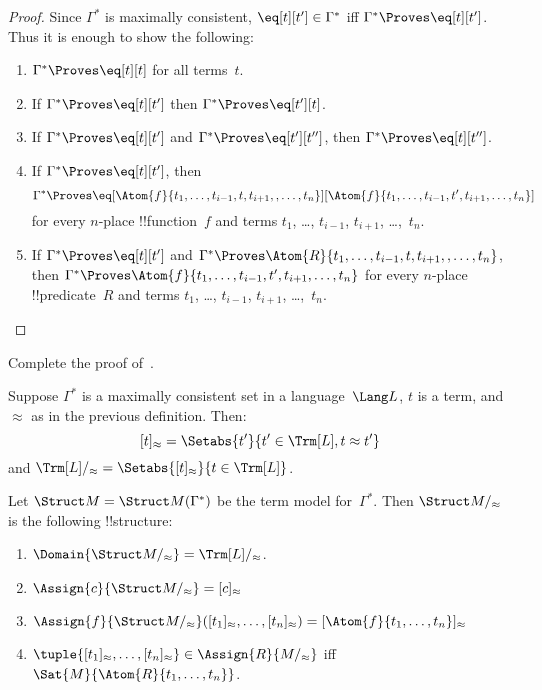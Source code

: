\documentclass[../../include/open-logic-section]{subfiles}
\begin{document}
\begin{proof}
Since $\Gamma^*$ is maximally consistent, $\eq[t][t'] \in \Gamma^*$
iff $\Gamma^* \Proves \eq[t][t']$. Thus it is enough to show the
following:
\begin{enumerate}
\item $\Gamma^* \Proves \eq[t][t]$ for all terms~$t$.
\item If $\Gamma^* \Proves \eq[t][t']$ then $\Gamma^* \Proves \eq[t'][t]$.
\item If $\Gamma^* \Proves \eq[t][t']$ and $\Gamma^* \Proves
  \eq[t'][t'']$, then $\Gamma^* \Proves \eq[t][t'']$.
\item If $\Gamma^* \Proves \eq[t][t']$, then 
\[
\Gamma^* \Proves
\eq[\Atom{f}{t_1,\dots,t_{i-1},t,t_{i+1},,\dots,t_n}][\Atom{f}{t_1,\dots,t_{i-1},t',t_{i+1},\dots,t_n}]
\]
for every $n$-place !!{function}~$f$ and terms $t_1$, \dots,
$t_{i-1}$, $t_{i+1}$, \dots,~$t_n$.
\item If $\Gamma^* \Proves \eq[t][t']$ and
$\Gamma^* \Proves
\Atom{R}{t_1,\dots,t_{i-1},t,t_{i+1},,\dots,t_n}$, then
$\Gamma^* \Proves \Atom{f}{t_1,\dots,t_{i-1},t',t_{i+1},\dots,t_n}$
for every $n$-place !!{predicate}~$R$ and terms $t_1$, \dots,
$t_{i-1}$, $t_{i+1}$, \dots,~$t_n$.
\end{enumerate}
\end{proof}

\begin{prob}
Complete the proof of~.
\end{prob}

\begin{defn}
Suppose $\Gamma^*$ is a maximally consistent set in a language~$\Lang
L$, $t$ is a term, and $\approx$ as in the previous definition. Then:
\[
[t]_\approx = \Setabs{t'}{t'\in \Trm[L], t \approx t'}
\]
and $\Trm[L]/_\approx = \Setabs{[t]_\approx}{t \in \Trm[L]}$.
\end{defn}

\begin{defn}
Let $\Struct M = \Struct M(\Gamma^*)$ be the term model for~$\Gamma^*$. Then
$\Struct M/_\approx$ is the following !!{structure}:
\begin{enumerate}
\item $\Domain{\Struct M/_\approx} = \Trm[L]/_\approx$.
\item $\Assign{c}{\Struct M/_\approx} = [c]_\approx$
\item $\Assign{f}{\Struct M/_\approx}([t_1]_\approx, \dots,
  [t_n]_\approx) = [\Atom{f}{t_1,\dots, t_n}]_\approx$
\item $\tuple{[t_1]_\approx, \dots, [t_n]_\approx} \in
  \Assign{R}{M/_\approx}$ iff $\Sat{M}{\Atom{R}{t_1,\dots, t_n}}$.
\end{enumerate}
\end{defn}
\end{document}
